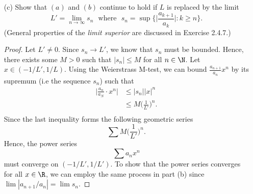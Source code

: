 \begin{enumerate}
\begin{proof}
        \end{proof}
    \item[(c)] Show that \( (a)  \) and \( (b)  \) continue to hold if \( L  \) is replaced by the limit 
        \[  L' = \lim_{ n \to \infty  }  s_n \text{~ where ~} s_n = \sup \Big\{  \Big| \frac{ a_{k+1} }{ a_k }  \Big| : k \geq n  \Big\}. \]
        (General properties of the \textit{limit superior} are discussed in Exercise 2.4.7.)
        \begin{proof}
            Let \( L' \neq 0  \). Since \( s_n \to L'  \), we know that \( s_n  \) must be bounded. Hence, there exists some \( M > 0  \) such that \( | s_n | \leq M  \) for all \( n \in \N  \). Let \( x \in (-1/L', 1/L) \). Using the Weierstrass M-test, we can bound \( \frac{ a_{n+1} }{ a_n }  x^n  \) by its supremum (i.e the sequence \( s_n \)) such that 
            \begin{align*}
            \Big| \frac{ a_{n} }{ a_{N} } \cdot x^n  \Big| &\leq | s_n | | x |^n \\
                                                             &\leq M \Big( \frac{ 1 }{ L' }  \Big)^n. \\
            \end{align*}
            Since the last inequality forms the following geometric series
            \[  \sum M \Big( \frac{ 1 }{ L' }  \Big)^n. \]
            Hence, the power series 
            \[  \sum a_n x^n  \] must converge on \( (-1/L', 1 / L' ) \).
        To show that the power series converges for all \( x \in \R  \), we can employ the same process in part (b) since \( \lim | a_{n+1} / a_{n} | = \lim s_n   \).
        \end{proof}
\end{enumerate}



